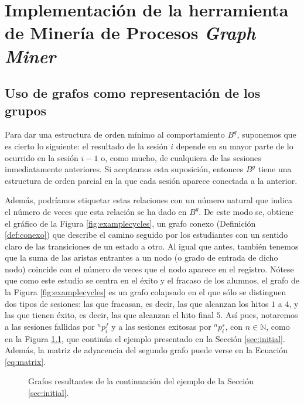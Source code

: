 \chapter{Implementación de la herramienta de Minería de Procesos \emph{Graph Miner}}\label{sec:chapterIV}

\section{Uso de grafos como representación de los grupos}

Para dar una estructura de orden mínimo al comportamiento $B^g$, suponemos que es cierto lo siguiente: el resultado de la sesión $i$ depende en su mayor parte de lo ocurrido en la sesión $i-1$ o, como mucho, de cualquiera de las sesiones inmediatamente anteriores. Si aceptamos esta suposición, entonces $B^g$ tiene una estructura de orden parcial en la que cada sesión aparece conectada a la anterior.

Además, podríamos etiquetar estas relaciones con un número natural que indica el número de veces que esta relación se ha dado en $B^g$. De este modo se, obtiene el gráfico de la Figura \ref{fig:examplecycles}, un grafo conexo (Definición \ref{def:conexo}) que describe el camino seguido por los estudiantes con un sentido claro de las transiciones de un estado a otro. Al igual que antes, también tenemos que la suma de las aristas entrantes a un nodo (o grado de entrada de dicho nodo) coincide con el número de veces que el nodo aparece en el registro. Nótese que como este estudio se centra en el éxito y el fracaso de los alumnos, el grafo de la Figura \ref{fig:examplecycles} es un grafo colapsado en el que sólo se distinguen dos tipos de sesiones: las que fracasan, es decir, las que alcanzan los hitos $1$ a $4$, y las que tienen éxito, es decir, las que alcanzan el hito final $5$. Así pues, notaremos a las sesiones fallidas por $^np_i^f$ y a las sesiones exitosas por $^np_i^s$, con $n \in \mathbb{N}$, como en la Figura \ref{fig:examples}, que continúa el ejemplo presentado en la Sección \ref{sec:initial}. Además, la matriz de adyacencia del segundo grafo puede verse en la Ecuación \ref{eq:matrix}.

\begin{figure}[H]
\centering
{}\qquad
{}
\caption{Grafos resultantes de la continuación del ejemplo de la Sección \ref{sec:initial}.}
\label{fig:examples}
\end{figure}

